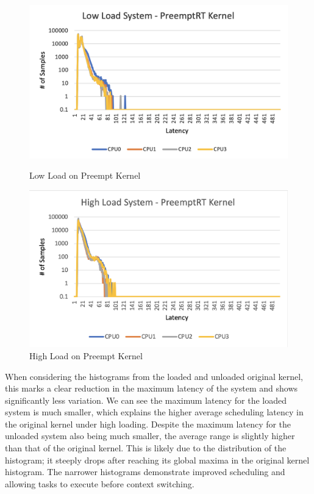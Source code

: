 \documentclass[a4paper,10pt]{article}
\begin{document}
\begin{figure}[H]
\centering
\begin{minipage}{0.5\textwidth}
  \centering
  \includegraphics[width=0.9\linewidth]{Images/preempt - low load hist.png}
  \caption{Low Load on Preempt Kernel}
\end{minipage}%
\begin{minipage}{0.5\textwidth}
  \centering
  \includegraphics[width=0.9\linewidth]{Images/preempt - high load hist.png}
  \caption{High Load on Preempt Kernel}
\end{minipage}
\end{figure}

When considering the histograms from the loaded and unloaded original kernel, this marks a clear reduction in the maximum latency of the system and shows significantly less variation. We can see the maximum latency for the loaded system is much smaller, which explains the higher average scheduling latency in the original kernel under high loading. Despite the maximum latency for the unloaded system also being much smaller, the average range is slightly higher than that of the original kernel. This is likely due to the distribution of the histogram; it steeply drops after reaching its global maxima in the original kernel histogram. The narrower histograms demonstrate improved scheduling and allowing tasks to execute before context switching. 
\end{document}
